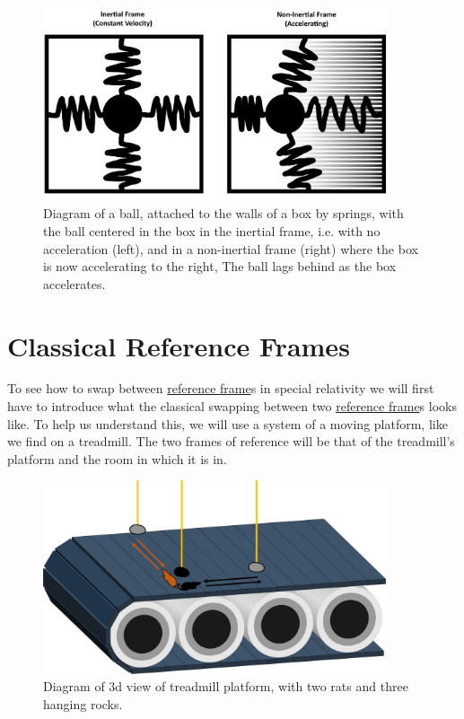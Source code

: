 \begin{figure}[H]
	\centering
	\includegraphics[width=0.9\textwidth]{images/pdf/Spring_boxes.pdf}
	\caption{Diagram of a ball, attached to the walls of a box by springs, with the ball centered in the box in the inertial frame, i.e. with no acceleration (left), and in a non-inertial frame (right) where the box is now accelerating to the right, The ball lags behind as the box accelerates.}
	\label{fig: spring boxes}
\end{figure}

\section{Classical Reference Frames}

To see how to swap between \hyperlink{def-Reference-frame}{reference frame}s in special relativity we will first have to introduce what the classical swapping between two \hyperlink{def-Reference-frame}{reference frame}s looks like. To help us understand this, we will use a system of a moving platform, like we find on a treadmill. The two frames of reference will be that of the treadmill's platform and the room in which it is in.

\begin{figure}[H]
	\centering
	\includegraphics[width=0.9\textwidth]{images/pdf/Conveyor_belt_3d.pdf}
	\caption{Diagram of 3d view of treadmill platform, with two rats and three hanging rocks.}
	\label{fig: 3d conveyor belt}
\end{figure}

